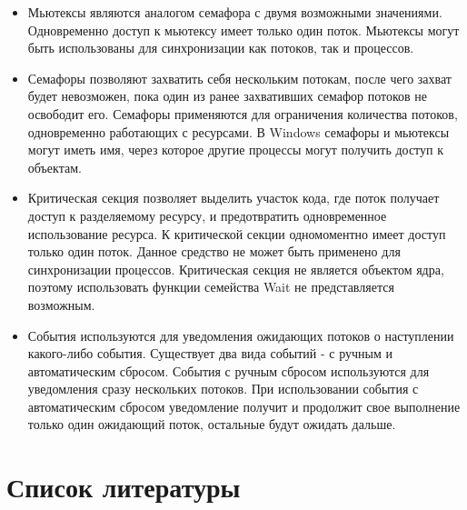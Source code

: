 \documentclass[14pt,a4paper,report]{report}
\begin{document}
\begin{itemize}
	\item Мьютексы являются аналогом семафора с двумя возможными значениями. Одновременно доступ к мьютексу имеет только один поток. Мьютексы могут быть использованы для синхронизации как потоков, так и процессов.
	
	\item Семафоры позволяют захватить себя нескольким потокам, после чего захват будет невозможен, пока один из ранее захвативших семафор потоков не освободит его. Семафоры применяются для ограничения количества потоков, одновременно работающих с ресурсами. В Windows семафоры и мьютексы могут иметь имя, через которое другие процессы могут получить доступ к объектам.
	
	\item Критическая секция позволяет выделить участок кода, где поток получает доступ к разделяемому ресурсу, и предотвратить одновременное использование ресурса. К критической секции одномоментно имеет доступ только один поток. Данное средство не может быть применено для синхронизации процессов. Критическая секция не является объектом ядра, поэтому использовать функции семейства Wait не представляется возможным.
	
	\item События используются для уведомления ожидающих потоков о наступлении какого-либо события. Существует два вида событий - с ручным и автоматическим сбросом. События с ручным сбросом используются для уведомления сразу нескольких потоков. При использовании события с автоматическим сбросом уведомление получит и продолжит свое выполнение только один ожидающий поток, остальные будут ожидать дальше.
	
\end{itemize}

\section{Список литературы}
\end{document}
